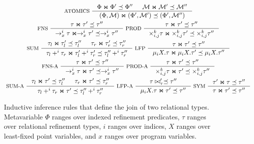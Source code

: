 \begin{figure}
  \centering
  \begin{gather*}
    \inference[ ATOMICS ]{
      \Phi \Join \Phi' \subtype \Phi'' &
      \mathcal{M} \Join \mathcal{M}' \subtype \mathcal{M}'' }{
      (\Phi, \mathcal{M}) \Join (\Phi', \mathcal{M}') \subtype %
      (\Phi', \mathcal{M}'') } \\
    \inference[ FNS ]{
      \tau \Join \tau' \subtype \tau'' }{
      \to_x^i \tau \Join \to_x^i \tau' \subtype \to_x^i \tau'' }
    \inference[ PROD ]{
      \tau \Join \tau' \subtype \tau'' }{
      \times_{i, j}^k \tau \Join %
      \times_{i, j}^k \tau' \subtype \times_{i, j}^k \tau'' } \\
    \inference[ SUM ]{
      \tau_l \Join \tau_l' \subtype \tau_l'' &
      \tau_r \Join \tau_r' \subtype \tau_r'' }{
      \tau_l +^i \tau_r \Join \tau_l' +^i \tau_r' %
      \subtype \tau_l'' +^i \tau_r'' } 
    \inference[ LFP ]{
      \tau \Join \tau' \subtype \tau'' }{
      \mu_i X. \tau \Join \mu_i X. \tau' \subtype %
      \mu_i X. \tau'' } \\
    \inference[ FNS-A ]{
      \tau \Join \tau' \subtype \tau'' }{
      \to_x^i \tau \Join \tau' \subtype \to_x^i \tau'' }
    \inference[ PROD-A ]{
      \tau \Join \tau' \subtype \tau'' }{
      \times_{i, j}^k \tau \Join \tau' \subtype %
      \times_{i, j}^k \tau'' } \\
    \inference[ SUM-A ]{
      \tau_l \Join \tau' \subtype \tau_l'' &
      \tau_r \Join \tau' \subtype \tau_r'' }{
      \tau_l +^i \tau_r \Join \tau' %
      \subtype \tau_l'' +^i \tau_r'' } 
    \inference[ LFP-A ]{
      \tau \join \tau' \subtype \tau'' }{
      \mu_i X. \tau \Join \tau' \subtype \tau'' } 
    \inference[ SYM ]{ %
      \tau' \Join \tau \subtype \tau'' }{ %
      \tau \Join \tau' \subtype \tau'' } 
  \end{gather*}
  \caption{Inductive inference rules that define the join of two relational types.
    Metavariable $\Phi$ ranges over indexed refinement predicates, %
    $\tau$ ranges over relational refinement types, %
    $i$ ranges over indices, %
    $X$ ranges over least-fixed point variables, and %
    $x$ ranges over program variables. }
  \label{fig:join}
\end{figure}

